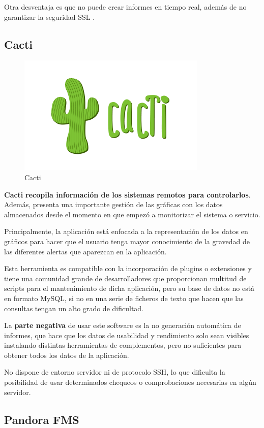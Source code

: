Otra desventaja es que no puede crear informes en tiempo real, además de no garantizar la seguridad SSL \cite{ssl}.

\subsection{Cacti}
\begin{figure}[H]
	\centering
	\includegraphics[scale=0.8]{imagenes/logos_monitorizacion/cacti.png}
	\caption{Cacti} \label{cacti}
\end{figure}
\textbf{Cacti} \cite{cacti} \textbf{recopila información de los sistemas remotos para controlarlos}. Además, presenta una importante gestión de las gráficas con los datos almacenados desde el momento en que empezó a monitorizar el sistema o servicio.

Principalmente, la aplicación está enfocada a la representación de los datos en gráficos para hacer que el usuario tenga mayor conocimiento de la gravedad de las diferentes alertas que aparezcan en la aplicación. 

Esta herramienta es compatible con la incorporación de plugins o extensiones y tiene una comunidad grande de desarrolladores que proporcionan multitud de scripts para el mantenimiento de dicha aplicación, pero su base de datos no está en formato MySQL, si no en una serie de ficheros de texto que hacen que las consultas tengan un alto grado de dificultad.

La \textbf{parte negativa} de usar este software es la no generación automática de informes, que hace que los datos de usabilidad y rendimiento solo sean visibles instalando distintas herramientas de complementos, pero no suficientes para obtener todos los datos de la aplicación.

No dispone de entorno servidor ni de protocolo SSH\cite{ssh}, lo que dificulta la posibilidad de usar determinados chequeos o comprobaciones necesarias en algún servidor.
\subsection{Pandora FMS}

